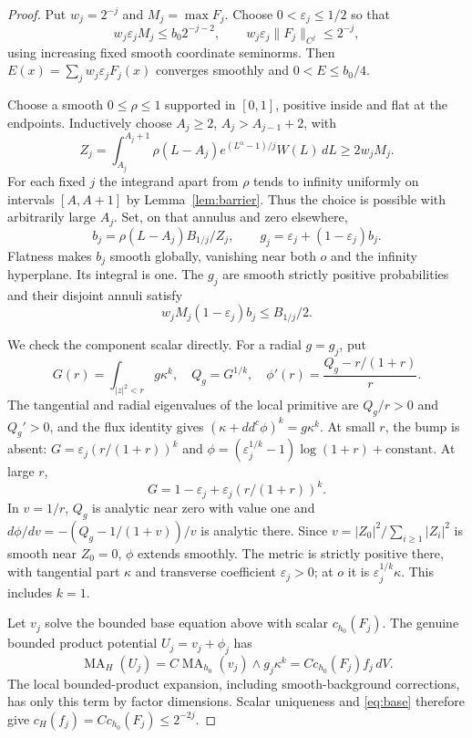 \documentclass[11pt]{article}
\newcommand{\ddc}{dd^c}
\newcommand{\MA}{\operatorname{MA}}
\theoremstyle{remark}\newtheorem{remark}[theorem]{Remark}
\begin{document}
\begin{proof}
Put $w_j=2^{-j}$ and $M_j=\max F_j$. Choose
$0<\varepsilon_j\leq1/2$ so that
\[
 w_j\varepsilon_jM_j\leq b_0 2^{-j-2},\qquad
 w_j\varepsilon_j\|F_j\|_{C^j}\leq2^{-j},
\]
using increasing fixed smooth coordinate seminorms. Then
$E(x)=\sum_jw_j\varepsilon_jF_j(x)$ converges smoothly and
$0<E\leq b_0/4$.

Choose a smooth $0\leq\rho\leq1$ supported in $[0,1]$, positive
inside and flat at the endpoints. Inductively choose
$A_j\geq2$, $A_j>A_{j-1}+2$, with
\[
 Z_j=\int_{A_j}^{A_j+1}\rho(L-A_j)e^{(L^\alpha-1)/j}W(L)\,dL
      \geq2w_jM_j.
\]
For each fixed $j$ the integrand apart from $\rho$ tends to infinity
uniformly on intervals $[A,A+1]$ by Lemma~\ref{lem:barrier}.
Thus the choice is possible with arbitrarily large $A_j$.
Set, on that annulus and zero elsewhere,
\[
 b_j=\rho(L-A_j)B_{1/j}/Z_j,\qquad
 g_j=\varepsilon_j+(1-\varepsilon_j)b_j.
\]
Flatness makes $b_j$ smooth globally, vanishing near both $o$ and
the infinity hyperplane. Its integral is one. The $g_j$ are smooth
strictly positive probabilities and their disjoint annuli satisfy
\begin{equation}\label{eq:bump}
 w_jM_j(1-\varepsilon_j)b_j\leq B_{1/j}/2.
\end{equation}

We check the component scalar directly. For a radial $g=g_j$, put
\[
 G(r)=\int_{|z|^2<r}g\kappa^k,\quad Q_g=G^{1/k},\quad
 \phi'(r)=\frac{Q_g-r/(1+r)}r.
\]
The tangential and radial eigenvalues of the local primitive are
$Q_g/r>0$ and $Q_g'>0$, and the flux identity gives
$(\kappa+\ddc\phi)^k=g\kappa^k$. At small $r$, the bump is absent:
$G=\varepsilon_j(r/(1+r))^k$ and
$\phi=(\varepsilon_j^{1/k}-1)\log(1+r)+\mathrm{constant}$.
At large $r$,
\[
 G=1-\varepsilon_j+\varepsilon_j(r/(1+r))^k.
\]
In $v=1/r$, $Q_g$ is analytic near zero with value one and
$d\phi/dv=-(Q_g-1/(1+v))/v$ is analytic there. Since
$v=|Z_0|^2/\sum_{i\geq1}|Z_i|^2$ is smooth near $Z_0=0$,
$\phi$ extends smoothly. The metric is strictly positive there,
with tangential part $\kappa$ and transverse coefficient
$\varepsilon_j>0$; at $o$ it is $\varepsilon_j^{1/k}\kappa$.
This includes $k=1$.

Let $v_j$ solve the bounded base equation above with scalar
$c_{h_0}(F_j)$. The genuine bounded product potential
$U_j=v_j+\phi_j$ has
\[
 \MA_H(U_j)=C\MA_{h_0}(v_j)\wedge g_j\kappa^k
          =C c_{h_0}(F_j)f_j\,dV.
\]
The local bounded-product expansion, including smooth-background
corrections, has only this term by factor dimensions. Scalar
uniqueness and \eqref{eq:base} therefore give
$c_H(f_j)=C c_{h_0}(F_j)\leq2^{-2j}$.


\end{proof}
\end{document}
